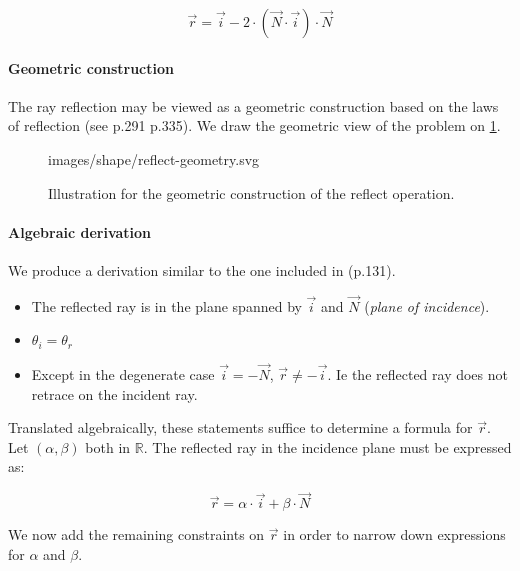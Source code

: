 \begin{equation}
\overrightarrow{r} = \overrightarrow{i} - 2 \cdot (\overrightarrow{N} \cdot
\overrightarrow{i}) \cdot \overrightarrow{N}
\end{equation}

\paragraph{Geometric construction}
The ray reflection may be viewed as a geometric construction based on the
laws of reflection (see \cite{Glassner:1989} p.291 \cite{Comninos:2010}
p.335). We draw the geometric view of the problem on
\cref{fig:reflect-geometry}.

\begin{figure} \caption{\label{fig:reflect-geometry} Illustration for the
geometric construction of the reflect operation.}

           {images/shape/reflect-geometry.svg}
\end{figure}

\paragraph{Algebraic derivation}
We produce a derivation similar to the one included in \cite{Glassner:1989}
(p.131).

\begin{itemize}
\item The reflected ray is in the plane spanned by $\overrightarrow{i}$ and
      $\overrightarrow{N}$ (\emph{plane of incidence}).
\item $\theta_i = \theta_r$
\item Except in the degenerate case $\overrightarrow{i} = - \overrightarrow{N}$,
$\overrightarrow{r} \neq - \overrightarrow{i}$. Ie the reflected ray does not
retrace on the incident ray.
\end{itemize}

Translated algebraically, these statements suffice to determine a formula for
$\overrightarrow{r}$. Let $(\alpha, \beta)$ both in $\mathbb{R}$. The reflected
ray in the incidence plane must be expressed as:

\begin{equation}
\overrightarrow{r} = \alpha \cdot \overrightarrow{i} +
                     \beta \cdot \overrightarrow{N}
\end{equation}

We now add the remaining constraints on $\overrightarrow{r}$ in order to narrow
down expressions for $\alpha$ and $\beta$.

